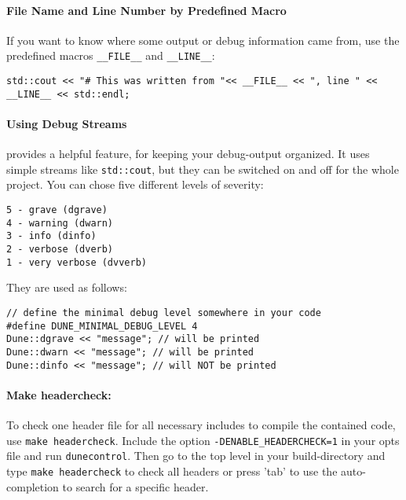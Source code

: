 \paragraph{File Name and Line Number by Predefined Macro}
If you want to  know where some output or debug information came from, use the predefined
macros \texttt{\_\_FILE\_\_} and \texttt{\_\_LINE\_\_}:
\begin{lstlisting}[style=DumuxCode]
std::cout << "# This was written from "<< __FILE__ << ", line " << __LINE__ << std::endl;
\end{lstlisting}

\paragraph{Using \Dune Debug Streams}
\Dune provides a helpful feature, for keeping your debug-output organized.
It uses simple streams like \texttt{std::cout}, but they can be switched on and off
for the whole project. You can chose five different levels of severity:
\begin{verbatim}
5 - grave (dgrave)
4 - warning (dwarn)
3 - info (dinfo)
2 - verbose (dverb)
1 - very verbose (dvverb)
\end{verbatim}
\noindent They are used as follows:
\begin{lstlisting}[style=DumuxCode]
// define the minimal debug level somewhere in your code
#define DUNE_MINIMAL_DEBUG_LEVEL 4
Dune::dgrave << "message"; // will be printed
Dune::dwarn << "message"; // will be printed
Dune::dinfo << "message"; // will NOT be printed
\end{lstlisting}

\paragraph{Make headercheck:}
To check one header file for all necessary includes to compile the contained code, use \texttt{make headercheck}.
Include the option \texttt{-DENABLE\_HEADERCHECK=1} in your opts file and run \texttt{dunecontrol}.
Then go to the top level in your build-directory and type \texttt{make headercheck} to check all headers
or press 'tab' to use the auto-completion to search for a specific header.
